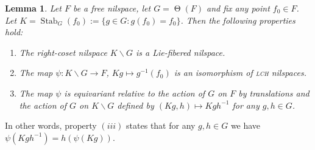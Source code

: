 \documentclass[a4paper,12pt,reqno]{amsart}
\newtheorem{lemma}[theorem]{Lemma}
\theoremstyle{definition}
\def\to{\rightarrow}
\DeclareMathOperator{\stab}{Stab}
\DeclareMathOperator{\tran}{\Theta}
\begin{document}
\begin{lemma}\label{lem_aux-for-dou-coset}
Let $F$ be a free nilspace, let $G=\tran(F)$ and fix any point $f_0\in F$. Let $K=\stab_G(f_0):=\{g\in G:g(f_0)=f_0\}$. Then the following properties hold:
\begin{enumerate}
    \item The right-coset nilspace $K\backslash G$ is a Lie-fibered nilspace.
    \item The map $\psi:K\backslash G\to F$, $Kg\mapsto g^{-1}(f_0)$ is an isomorphism of \textsc{lch} nilspaces.
    \item The map $\psi$ is  equivariant relative to the action of $G$ on $F$ by translations and the action of $G$ on $K\backslash G$ defined by $(Kg,h)\mapsto Kgh^{-1}$ for any $g,h\in G$. 
\end{enumerate}
\end{lemma}
\noindent In other words, property $(iii)$
 states that for any $g,h\in G$ we have $\psi(Kgh^{-1})=h(\psi(Kg))$.
\end{document}
